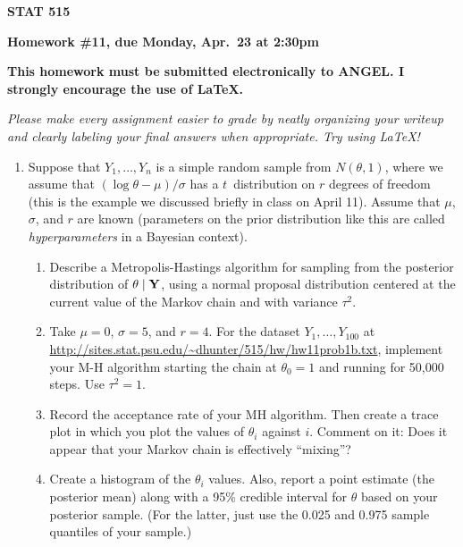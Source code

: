 \documentclass{article}
\def\vec#1{\mathchoice{\mbox{\boldmath$\displaystyle\bf#1$}}
{\mbox{\boldmath$\textstyle\bf#1$}}
{\mbox{\boldmath$\scriptstyle\bf#1$}}
{\mbox{\boldmath$\scriptscriptstyle\bf#1$}}}
\begin{document}
\begin{center}
{\bf STAT 515}

{\bf Homework \#11, due Monday, Apr.~23 at 2:30pm}

{\bf This homework must be submitted electronically to ANGEL. I strongly
encourage the use of \LaTeX.}

\end{center}

{\it Please make every assignment easier to grade by neatly organizing your
writeup and clearly labeling your final answers when appropriate. Try using
\LaTeX!}


\begin{enumerate}

  \item Suppose that $Y_1, \ldots, Y_n$ is a simple random sample from
  $N(\theta, 1)$, where we assume that $(\log \theta-\mu)/\sigma$ has a
  $t$~distribution on $r$ degrees of freedom (this is the example we discussed
  briefly in class on April 11). Assume that $\mu$, $\sigma$, and $r$ are known
  (parameters on the prior distribution like this are called {\em
  hyperparameters} in a Bayesian context).
  
    \begin{enumerate}

      \item Describe a Metropolis-Hastings algorithm for sampling from the
      posterior distribution of $\theta\mid \vec Y$, using a normal proposal
      distribution centered at the current value of the Markov chain and with
      variance $\tau^2$.
      
      \item Take $\mu=0$, $\sigma=5$, and $r=4$. For the dataset $Y_1, \ldots,
      Y_{100}$ at
      \url{http://sites.stat.psu.edu/~dhunter/515/hw/hw11prob1b.txt}, implement
      your M-H algorithm starting the chain at $\theta_0=1$ and running for
      50,000 steps. Use $\tau^2=1$.
      
      \item Record the acceptance rate of your MH algorithm. Then create a trace
      plot in which you plot the values of $\theta_i$ against $i$. Comment on
      it: Does it appear that your Markov chain is effectively ``mixing''?
      
      \item Create a histogram of the $\theta_i$ values. Also, report a point
      estimate (the posterior mean) along with a 95\% credible interval for
      $\theta$ based on your posterior sample. (For the latter, just use the
      0.025 and 0.975 sample quantiles of your sample.)
      

\end{enumerate}
\end{enumerate}
\end{document}
